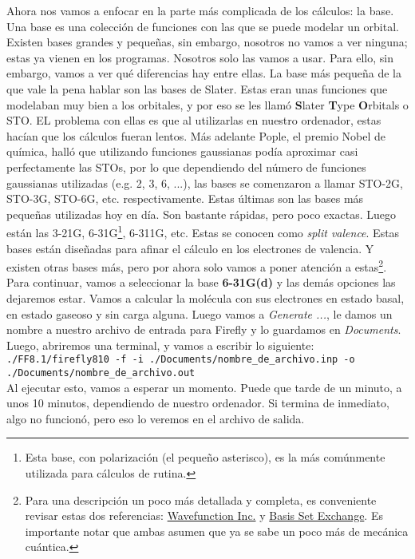 \documentclass[10pt,letterpaper]{article}
\newcommand{\inlinecode}[1]{
\colorbox{light-gray}{\texttt{#1}}
}
\begin{document}
Ahora nos vamos a enfocar en la parte m\'as complicada de los c\'alculos: la base. Una base es una colecci\'on de funciones con las que se puede modelar un orbital. Existen bases grandes y peque\~nas, sin embargo, nosotros no vamos a ver ninguna; estas ya vienen en los programas. Nosotros solo las vamos a usar. Para ello, sin embargo, vamos a ver qu\'e diferencias hay entre ellas. La base m\'as peque\~na de la que vale la pena hablar son las bases de Slater. Estas eran unas funciones que modelaban muy bien a los orbitales, y por eso se les llam\'o \textbf{S}later \textbf{T}ype \textbf{O}rbitals o STO. EL problema con ellas es que al utilizarlas en nuestro ordenador, estas hac\'ian que los c\'alculos fueran lentos. M\'as adelante Pople, el premio Nobel de qu\'imica, hall\'o que utilizando funciones gaussianas pod\'ia aproximar casi perfectamente las STOs, por lo que dependiendo del n\'umero de funciones gaussianas utilizadas (e.g. 2, 3, 6, ...), las bases se comenzaron a llamar STO-2G, STO-3G, STO-6G, etc. respectivamente. Estas \'ultimas son las bases m\'as peque\~nas utilizadas hoy en d\'ia. Son bastante r\'apidas, pero poco exactas. Luego est\'an las 3-21G, 6-31G\footnote{Esta base, con polarizaci\'on (el peque\~no asterisco), es la m\'as com\'unmente utilizada para c\'alculos de rutina.}, 6-311G, etc. Estas se conocen como \emph{split valence}. Estas bases est\'an dise\~nadas para afinar el c\'alculo en los electrones de valencia. Y existen otras bases m\'as, pero por ahora solo vamos a poner atenci\'on a estas\footnote{Para una descripci\'on un poco m\'as detallada y completa, es conveniente revisar estas dos referencias: \href{https://www.wavefun.com/support/sp_compfaq/Basis_Set_FAQ.html}{Wavefunction Inc.} y \href{https://bse.pnl.gov/bse/portal}{Basis Set Exchange}. Es importante notar que ambas asumen que ya se sabe un poco m\'as de mec\'anica cu\'antica.}.\\

Para continuar, vamos a seleccionar la base \textbf{6-31G(d)} y las dem\'as opciones las dejaremos estar. Vamos a calcular la mol\'ecula con sus electrones en estado basal, en estado gaseoso y sin carga alguna. Luego vamos a \textit{Generate ...}, le damos un nombre a nuestro archivo de entrada para Firefly y lo guardamos en \textit{Documents}. Luego, abriremos una terminal, y vamos a escribir lo siguiente:\\
\inlinecode{./FF8.1/firefly810 -f -i ./Documents/nombre\_de\_archivo.inp -o ./Documents/nombre\_de\_archivo.out}\\
Al ejecutar esto, vamos a esperar un momento. Puede que tarde de un minuto, a unos 10 minutos, dependiendo de nuestro ordenador. Si termina de inmediato, algo no funcion\'o, pero eso lo veremos en el archivo de salida.\\
\end{document}

